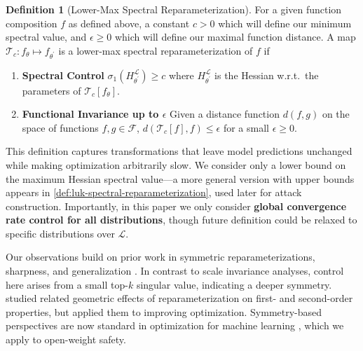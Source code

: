 \documentclass{article}
\theoremstyle{plain}
\theoremstyle{definition}
\newtheorem{definition}[theorem]{Definition}
\theoremstyle{remark}
\begin{document}
\begin{definition}[Lower-Max Spectral Reparameterization]
\label{def:upper-max-spec-reparam}
For a given function composition $f$ as defined above, a constant $c > 0$ which will define our minimum spectral value, and $\epsilon \geq 0$ which will define our maximal function distance. A map $\mathcal{T}_c: f_\theta \mapsto f_{\theta^\prime}$ is a lower-max spectral reparameterization of $f$ if
\begin{enumerate}[nolistsep,leftmargin=*]
    \item \textbf{Spectral Control} $\sigma_1(H^{\mathcal{L}}_{\theta^\prime}) \geq c$ where $H^{\mathcal{L}}_{\theta^\prime}$ is the Hessian w.r.t.\ the parameters of $\mathcal{T}_c[f_{\theta}]$.
    \item \textbf{Functional Invariance up to $\epsilon$} Given a distance function $d(f, g)$ on the space of functions $f,g \in \mathcal{F}$, $d(\mathcal{T}_c[f], f) \leq \epsilon $ for a small $\epsilon \geq 0$.
\end{enumerate}
\end{definition}

This definition captures transformations that leave model predictions unchanged while making optimization arbitrarily slow. We consider only a lower bound on the maximum Hessian spectral value---a more general version with upper bounds appears in \cref{def:luk-spectral-reparameterization}, used later for attack construction. Importantly, in this paper we only consider  \textbf{global convergence rate control for all distributions}, though future definition could be relaxed to specific distributions over $\mathcal{L}$.

Our observations build on prior work in symmetric reparameterizations, sharpness, and generalization \citep{dinh2017sharp,foret2020sharpness}. In contrast to scale invariance analyses, control here arises from a small top-$k$ singular value, indicating a deeper symmetry. \citet{kristiadi2023geometry} studied related geometric effects of reparameterization on first- and second-order properties,  but applied them to improving optimization. Symmetry-based perspectives are now standard in optimization for machine learning \citep{simsek2021geometry, zhao2022symmetry}, which we apply to open-weight safety.
\end{document}
